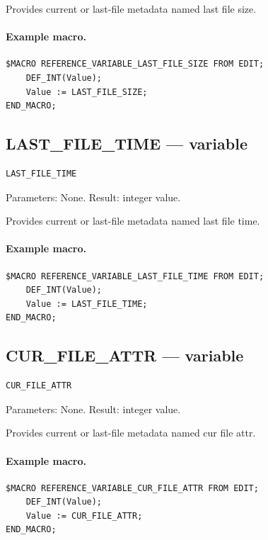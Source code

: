 \documentclass[a4paper,10pt,twoside,openany]{book}
\begin{document}
Provides current or last-file metadata named last file size.

\paragraph{Example macro.}
\begin{verbatim}
$MACRO REFERENCE_VARIABLE_LAST_FILE_SIZE FROM EDIT;
    DEF_INT(Value);
    Value := LAST_FILE_SIZE;
END_MACRO;
\end{verbatim}

\label{prim:variable-last-file-time}
\subsection*{LAST\_FILE\_TIME --- variable}
\begin{verbatim}
LAST_FILE_TIME
\end{verbatim}
Parameters: None. Result: integer value.

Provides current or last-file metadata named last file time.

\paragraph{Example macro.}
\begin{verbatim}
$MACRO REFERENCE_VARIABLE_LAST_FILE_TIME FROM EDIT;
    DEF_INT(Value);
    Value := LAST_FILE_TIME;
END_MACRO;
\end{verbatim}

\label{prim:variable-cur-file-attr}
\subsection*{CUR\_FILE\_ATTR --- variable}
\begin{verbatim}
CUR_FILE_ATTR
\end{verbatim}
Parameters: None. Result: integer value.

Provides current or last-file metadata named cur file attr.

\paragraph{Example macro.}
\begin{verbatim}
$MACRO REFERENCE_VARIABLE_CUR_FILE_ATTR FROM EDIT;
    DEF_INT(Value);
    Value := CUR_FILE_ATTR;
END_MACRO;
\end{verbatim}
\end{document}
